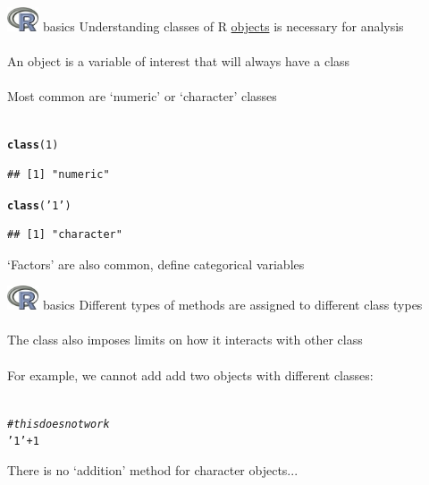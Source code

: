 \documentclass[xcolor=svgnames]{beamer}\usepackage[]{graphicx}\usepackage[]{color}
\makeatletter
\newcommand{\hlnum}[1]{\textcolor[rgb]{0.686,0.059,0.569}{#1}}%
\newcommand{\hlstr}[1]{\textcolor[rgb]{0.192,0.494,0.8}{#1}}%
\newcommand{\hlcom}[1]{\textcolor[rgb]{0.678,0.584,0.686}{\textit{#1}}}%
\newcommand{\hlopt}[1]{\textcolor[rgb]{0,0,0}{#1}}%
\newcommand{\hlstd}[1]{\textcolor[rgb]{0.345,0.345,0.345}{#1}}%
\newcommand{\hlkwd}[1]{\textcolor[rgb]{0.737,0.353,0.396}{\textbf{#1}}}%
\newenvironment{kframe}{%
 \def\at@end@of@kframe{}%
 \ifinner\ifhmode%
  \def\at@end@of@kframe{\end{minipage}}%
  \begin{minipage}{\columnwidth}%
 \fi\fi%
 \def\FrameCommand##1{\hskip\@totalleftmargin \hskip-\fboxsep
 \colorbox{shadecolor}{##1}\hskip-\fboxsep
     \hskip-\linewidth \hskip-\@totalleftmargin \hskip\columnwidth}%
 \MakeFramed {\advance\hsize-\width
   \@totalleftmargin\z@ \linewidth\hsize
   \@setminipage}}%
 {\par\unskip\endMakeFramed%
 \at@end@of@kframe}
\newenvironment{knitrout}{}{} %
\makeatother
\begin{document}
\begin{frame}[fragile,t]{\includegraphics[width=0.07\textwidth]{Rlogo.jpg} \hspace{0.01in} basics}
Understanding classes of R \href{http://cran.r-project.org/doc/manuals/r-release/R-lang.html#Vector-objects}{objects} is necessary for analysis \\~\\
An object is a variable of interest that will always have a class\\~\\
Most common are `numeric' or `character' classes \\~\\
\begin{knitrout}\scriptsize
{}\color{fgcolor}\begin{kframe}
\begin{alltt}
\hlkwd{class}\hlstd{(}\hlnum{1}\hlstd{)}
\end{alltt}
\begin{verbatim}
## [1] "numeric"
\end{verbatim}
\begin{alltt}
\hlkwd{class}\hlstd{(}\hlstr{'1'}\hlstd{)}
\end{alltt}
\begin{verbatim}
## [1] "character"
\end{verbatim}
\end{kframe}
\end{knitrout}
`Factors' are also common, define categorical variables
\end{frame}

\begin{frame}[fragile,t]{\includegraphics[width=0.07\textwidth]{Rlogo.jpg} \hspace{0.01in} basics}
Different types of methods are assigned to different class types\\~\\
The class also imposes limits on how it interacts with other class \\~\\
For example, we cannot add add two objects with different classes:\\~\\
\begin{knitrout}\scriptsize
{}\color{fgcolor}\begin{kframe}
\begin{alltt}
\hlcom{# this does not work}
\hlstr{'1'} \hlopt{+} \hlnum{1}
\end{alltt}


{\ttfamily\noindent\bfseries\color{errorcolor}{\#\# Error: non-numeric argument to binary operator}}\end{kframe}
\end{knitrout}
There is no `addition' method for character objects...
\end{frame}
\end{document}
